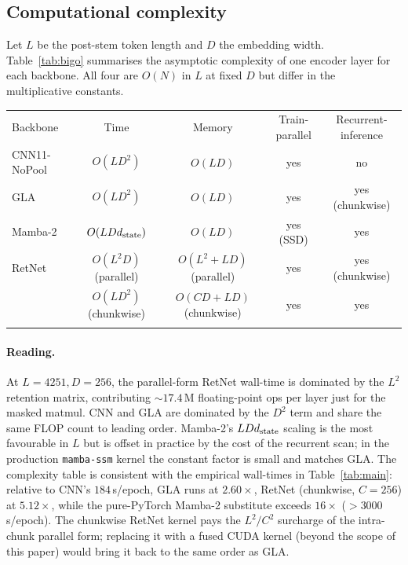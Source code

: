\documentclass[final]{ws-ijwmip}
\begin{document}
\subsection{Computational complexity}

Let $L$ be the post-stem token length and $D$ the embedding width.
Table~\ref{tab:bigo} summarises the asymptotic complexity of one
encoder layer for each backbone. All four are $O(N)$ in $L$ at fixed
$D$ but differ in the multiplicative constants.

\begin{table}[!htbp]
{\begin{tabular}{lcccc}
\toprule
Backbone & Time & Memory & Train-parallel & Recurrent-inference \\
\colrule
CNN11-NoPool & $O(LD^2)$               & $O(LD)$                    & yes & no \\
GLA          & $O(LD^2)$               & $O(LD)$                    & yes & yes (chunkwise) \\
Mamba-2      & $O(LDd_{\rm state})$    & $O(LD)$                    & yes (SSD) & yes \\
RetNet       & $O(L^2 D)$ (parallel)   & $O(L^2 + LD)$ (parallel)   & yes & yes (chunkwise) \\
             & $O(LD^2)$ (chunkwise)   & $O(CD + LD)$ (chunkwise)   & yes & yes \\
\botrule
\end{tabular}}
\end{table}

\paragraph{Reading.}
At $L=4251, D=256$, the parallel-form RetNet wall-time is dominated by
the $L^2$ retention matrix, contributing $\sim 17.4\,$M floating-point
ops per layer just for the masked matmul. CNN and GLA are dominated by
the $D^2$ term and share the same FLOP count to leading order. Mamba-2's
$L D d_{\rm state}$ scaling is the most favourable in $L$ but is offset
in practice by the cost of the recurrent scan; in the production
\texttt{mamba-ssm} kernel the constant factor is small and matches GLA.
The complexity table is consistent with the empirical wall-times in
Table~\ref{tab:main}: relative to CNN's $184\,$s/epoch, GLA runs at
$2.60\times$, RetNet (chunkwise, $C=256$) at $5.12\times$, while the
pure-PyTorch Mamba-2 substitute exceeds $16\times$ ($>\!3000\,$s/epoch).
The chunkwise RetNet kernel pays the $L^2 / C^2$ surcharge of the
intra-chunk parallel form; replacing it with a fused CUDA kernel
(beyond the scope of this paper) would bring it back to the same
order as GLA.
\end{document}
